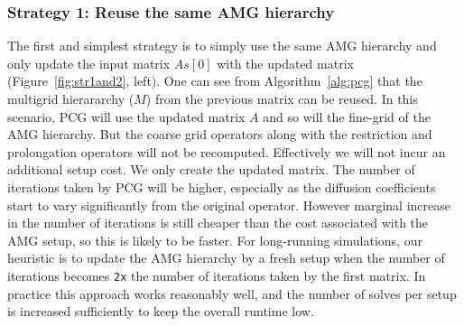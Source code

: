 
\subsubsection{Strategy 1: Reuse the same AMG hierarchy}

The first and simplest strategy is to simply use the same AMG hierarchy and only update the input matrix $As[0]$
with the updated matrix (Figure~\ref{fig:str1and2}, left).
One can see from Algorithm~\ref{alg:pcg} that the multigrid hierararchy ($M$) from the previous matrix can be reused.
In this scenario, PCG will use the updated matrix $A$ and so will the fine-grid of the AMG hierarchy.
But the coarse grid operators along with the restriction and prolongation operators will not be recomputed.
Effectively we will not incur an additional setup cost. We only create the updated matrix.
The number of iterations taken by PCG will be higher,
especially as the diffusion coefficients start to vary significantly from the original operator.
However marginal increase in the number of iterations is still cheaper than the cost associated with the AMG setup,
so this is likely to be faster. For long-running simulations, our heuristic is to update the AMG hierarchy by a fresh
setup when the number of iterations becomes \texttt{2x} the number of iterations taken by the first matrix.
In practice this approach works reasonably well, and the number of solves per setup is increased sufficiently to keep
the overall runtime low.

